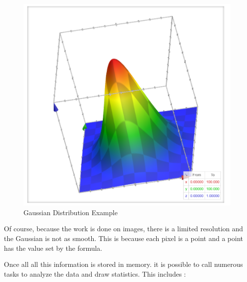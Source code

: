 \documentclass[a4paper,11pt]{report}
\numberwithin{figure}{section} %
\begin{document}
    \begin{figure}[H]
      \centering
      \includegraphics[width=.45\linewidth]{plots/gaussian2D.png}
      \caption{Gaussian Distribution Example}
      \label{fig:gaus22}
    \end{figure}

    Of course, because the work is done on images, there is a limited resolution and the Gaussian is not as smooth.
    This is because each pixel is a point and a point has the value set by the formula.
    \newline

    Once all all this information is stored in memory.
    it is possible to call numerous tasks to analyze the data and draw statistics.
    This includes :
\end{document}
